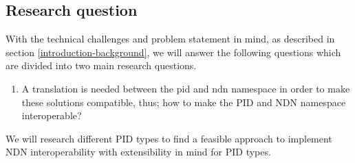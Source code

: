 


\subsection{Research question}
\label{introduction-research-question}
With the technical challenges and problem statement in mind, as described in section \ref{introduction-background}, we will answer the following questions which are divided into two main research questions.

\begin{enumerate}
	\item A translation is needed between the \gls{pid} and \gls{ndn} namespace in order to make these solutions compatible, thus; how to make the PID and NDN namespace interoperable?
\end{enumerate}

We will research different PID types to find a feasible approach to implement NDN interoperability with extensibility in mind for PID types.

